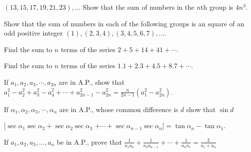   $(13, 15, 17, 19, 21, 23), \ldots$
  Show that the sum of numbers in the $n$th group is $4n^3$.
\item Show that the sum of numbers in each of the following groups is an square of an odd positive integer $(1), (2,3,4),
  (3,4,5,6,7), \ldots$.
\item Find the sum to $n$ terms of the series $2 + 5 + 14 + 41 + \cdots$.
\item Find the sum to $n$ terms of the series $1.1 + 2.3 + 4.5 + 8.7 + \cdots$.
\item If $a_1, a_2, a_3, \cdots, a_{2n}$ are in A.P., show that $a_1^2 - a_2^2 + a_3^2 - a_4^2 + \cdots + a_{2n - 1}^2 -
  a_{2n}^2 = \frac{n}{2n - 1}(a_1^2 - a_{2n}^2)$.
\item If $\alpha_1, \alpha_2, \alpha_3, \cdots, \alpha_n$ are in A.P., whose common difference is $d$ show that $\sin
  d$

  $[\sec\alpha_1\sec\alpha_2 + \sec\alpha_2\sec\alpha_3$ $+ \cdots + \sec\alpha_{n - 1}\sec\alpha_n] = \tan\alpha_n -
  \tan\alpha_1$.
\item If $a_1, a_2, a_3, \ldots, a_n$ be in A.P., prove that $\frac{1}{a_1a_n} + \frac{1}{a_2a_{n - 1}} + \cdots +
  \frac{1}{a_na_1} =\frac{2}{a_1 + a_n}$

